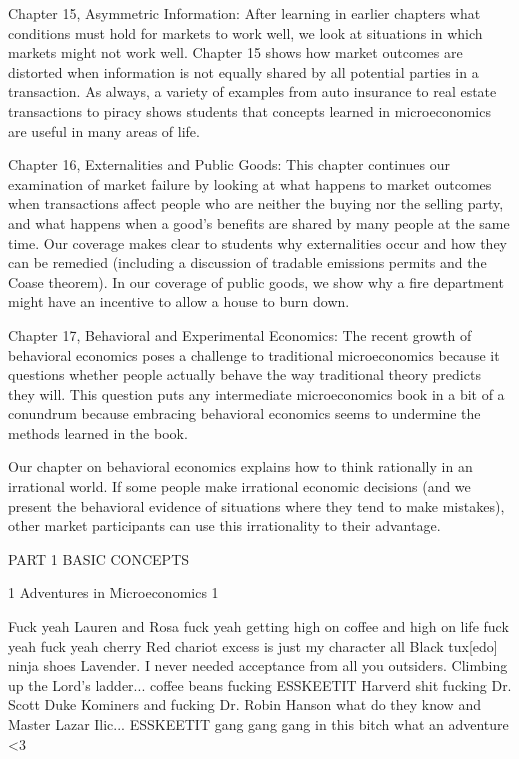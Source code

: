 Chapter 15, Asymmetric Information: After learning in earlier chapters what conditions must hold for markets to work well, we look at situations in which markets might not work well. Chapter 15 shows how market outcomes are distorted when information is not equally shared by all potential parties in a transaction. As always, a variety of examples from auto insurance to real estate transactions to piracy shows students that concepts learned in microeconomics are useful in many areas of life.

Chapter 16, Externalities and Public Goods: This chapter continues our examination of market failure by looking at what happens to market outcomes when transactions affect people who are neither the buying nor the selling party, and what happens when a good's benefits are shared by many people at the same time. Our coverage makes clear to students why externalities occur and how they can be remedied (including a discussion of tradable emissions permits and the Coase theorem). In our coverage of public goods, we show why a fire department might have an incentive to allow a house to burn down.

Chapter 17, Behavioral and Experimental Economics: The recent growth of behavioral economics poses a challenge to traditional microeconomics because it questions whether people actually behave the way traditional theory predicts they will. This question puts any intermediate microeconomics book in a bit of a conundrum because embracing behavioral economics seems to undermine the methods learned in the book.

Our chapter on behavioral economics explains how to think rationally in an irrational world. If some people make irrational economic decisions (and we present the behavioral evidence of situations where they tend to make mistakes), other market participants can use this irrationality to their advantage.

PART 1 BASIC CONCEPTS



1 Adventures in Microeconomics 1

Fuck yeah Lauren and Rosa fuck yeah getting high on coffee and high on life fuck yeah fuck yeah cherry Red chariot excess is just my character all Black tux[edo] ninja shoes Lavender. I never needed acceptance from all you outsiders. Climbing up the Lord's ladder... coffee beans fucking ESSKEETIT Harverd shit fucking Dr. Scott Duke Kominers and fucking Dr. Robin Hanson what do they know and Master Lazar Ilic... ESSKEETIT gang gang gang in this bitch what an adventure <3

